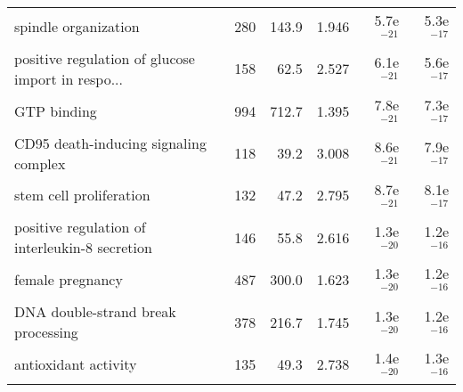 \begin{longtable}{lrrrrr}
                              spindle organization &                     280 &                   143.9 &      1.946 &         5.7e$^{-21}$ &         5.3e$^{-17}$ \\
 positive regulation of glucose import in respo... &                     158 &                    62.5 &      2.527 &         6.1e$^{-21}$ &         5.6e$^{-17}$ \\
                                       GTP binding &                     994 &                   712.7 &      1.395 &         7.8e$^{-21}$ &         7.3e$^{-17}$ \\
             CD95 death-inducing signaling complex &                     118 &                    39.2 &      3.008 &         8.6e$^{-21}$ &         7.9e$^{-17}$ \\
                           stem cell proliferation &                     132 &                    47.2 &      2.795 &         8.7e$^{-21}$ &         8.1e$^{-17}$ \\
    positive regulation of interleukin-8 secretion &                     146 &                    55.8 &      2.616 &         1.3e$^{-20}$ &         1.2e$^{-16}$ \\
                                  female pregnancy &                     487 &                   300.0 &      1.623 &         1.3e$^{-20}$ &         1.2e$^{-16}$ \\
                DNA double-strand break processing &                     378 &                   216.7 &      1.745 &         1.3e$^{-20}$ &         1.2e$^{-16}$ \\
                              antioxidant activity &                     135 &                    49.3 &      2.738 &         1.4e$^{-20}$ &         1.3e$^{-16}$ \\
\end{longtable}
